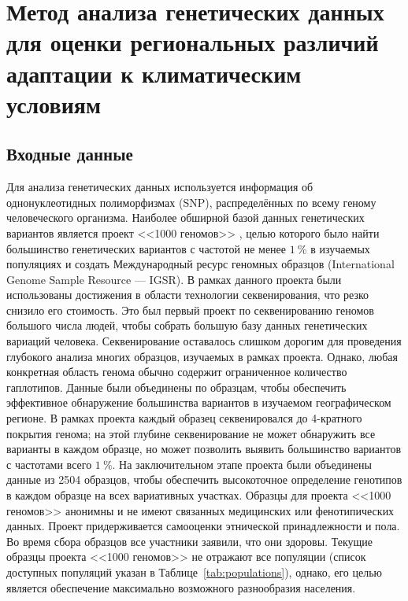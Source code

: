 \chapter{Метод анализа генетических данных для оценки региональных различий адаптации к климатическим условиям}\label{ch:ch3}

\section{Входные данные}\label{sec:ch3/sec1}

Для анализа генетических данных используется информация об однонуклеотидных полиморфизмах (SNP), распределённых по всему геному человеческого организма. Наиболее обширной базой данных генетических вариантов является проект <<1000 геномов>> \autocite{1000genomes2015, Sudmant2015}, целью которого было найти большинство генетических вариантов с частотой не менее $1~\%$ в изучаемых популяциях и создать Международный ресурс геномных образцов (International Genome Sample Resource --- IGSR). В рамках данного проекта были использованы достижения в области технологии секвенирования, что резко снизило его стоимость. Это был первый проект по секвенированию геномов большого числа людей, чтобы собрать большую базу данных генетических вариаций человека. Секвенирование оставалось слишком дорогим для проведения глубокого анализа многих образцов, изучаемых в рамках проекта. Однако, любая конкретная область генома обычно содержит ограниченное количество гаплотипов. Данные были объединены по образцам, чтобы обеспечить эффективное обнаружение большинства вариантов в изучаемом географическом регионе. В рамках проекта каждый образец секвенировался до 4-кратного покрытия генома; на этой глубине секвенирование не может обнаружить все варианты в каждом образце, но может позволить выявить большинство вариантов с частотами всего $1~\%$. На заключительном этапе проекта были объединены данные из 2504 образцов, чтобы обеспечить высокоточное определение генотипов в каждом образце на всех вариативных участках. Образцы для проекта <<1000 геномов>> анонимны и не имеют связанных медицинских или фенотипических данных. Проект придерживается самооценки этнической принадлежности и пола. Во время сбора образцов все участники заявили, что они здоровы. Текущие образцы проекта <<1000 геномов>> не отражают все популяции (список доступных популяций указан в Таблице~\ref{tab:populations}), однако, его целью является обеспечение максимально возможного разнообразия населения. 

